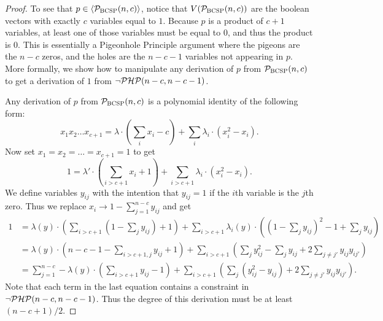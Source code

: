 \begin{proof}
To see that $p \in \langle \mathcal P_{\textsc{BCSP}}(n,c) \rangle$, notice that $V(\mathcal P_{\textsc{BCSP}}(n,c))$ are the boolean vectors with exactly $c$ variables equal to $1$.
Because $p$ is a product of $c+1$ variables, at least one of those variables must be equal to $0$, and thus the product is $0$. 
This is essentially a Pigeonhole Principle argument where the pigeons are the $n-c$ zeros, and the holes are the $n-c-1$ variables not appearing in $p$.
More formally, we show how to manipulate any derivation of $p$ from $\mathcal P_{\textsc{BCSP}}(n,c)$ to get a derivation of $1$ from $\neg\mathcal P\mathcal H\mathcal P(n-c,n-c-1)$.

Any derivation of $p$ from $\mathcal P_{\textsc{BCSP}}(n,c)$ is a polynomial identity of the following form:
\[x_1x_2\dots x_{c+1} = \lambda \cdot (\sum_i x_i - c) + \sum_i \lambda_i \cdot (x_i^2 - x_i).\]
Now set $x_1 = x_2 = \dots = x_{c+1} = 1$ to get
\[1 = \lambda' \cdot (\sum_{i > c+1} x_i + 1) + \sum_{i > c+1} \lambda_i \cdot (x_i^2 - x_i).\]
We define variables $y_{ij}$ with the intention that $y_{ij} = 1$ if the $i$th variable is the $j$th zero. Thus we replace $x_i \rightarrow 1 - \sum_{j=1}^{n-c} y_{ij}$ and get
\begin{align*}
1 &= \lambda(y) \cdot \left(\sum_{i > c+1} \left(1 - \sum_j y_{ij}\right) + 1\right) + \sum_{i > c+1} \lambda_i(y) \cdot \left( \left(1 - \sum_j y_{ij}\right)^2 - 1 + \sum_j y_{ij}\right) \\
&= \lambda(y) \cdot \left(n-c-1 - \sum_{i> c+1, j} y_{ij} + 1\right) + \sum_{i > c+1} \left(\sum_j y_{ij}^2 - \sum_j y_{ij} + 2\sum_{j\neq j'} y_{ij}y_{ij'}\right) \\
&= \sum_{j=1}^{n-c} -\lambda(y)\cdot\left(\sum_{i > c+1} y_{ij} - 1\right) + \sum_{i > c+1} \left(\sum_j \left(y_{ij}^2 - y_{ij}\right) + 2\sum_{j\neq j'} y_{ij}y_{ij'}\right).
\end{align*}
Note that each term in the last equation contains a constraint in $\neg\mathcal P\mathcal H\mathcal P(n-c,n-c-1)$. Thus the degree of this derivation must be at least  $(n-c+1)/2$.
\end{proof}

